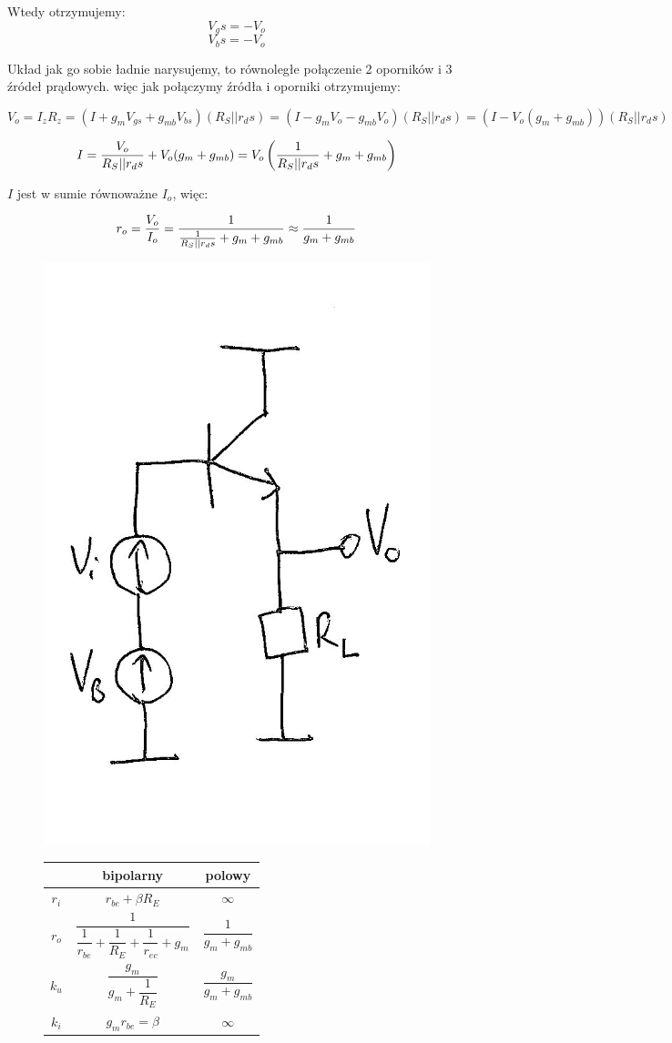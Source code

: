 \documentclass[10pt,a4paper]{article}
\begin{document}
Wtedy otrzymujemy:
\begin{equation}
V_gs = - V_o
\end{equation}
\begin{equation}
V_bs = - V_o
\end{equation}

Układ jak go sobie ładnie narysujemy, to równoległe połączenie 2 oporników i 3 źródeł prądowych. więc jak połączymy źródła i oporniki otrzymujemy:

\begin{equation}
V_o = {I_z R_z} = (I + g_mV_{gs} + g_{mb}V_{bs})(R_S || r_ds) = (I - g_mV_o - g_{mb}V_o)(R_S || r_ds) = (I - V_o(g_m + g_{mb}))(R_S || r_ds)
\end{equation}

\begin{equation}
I = {V_o \over R_S || r_ds} + V_o(g_m + g_{mb}) = V_o\left({1 \over R_S || r_ds} + g_m + g_{mb}\right)
\end{equation}

$I$ jest w sumie równoważne $I_o$, więc:

\begin{equation}
r_o = {V_o \over I_o} = {1 \over{1 \over R_S || r_ds} + g_m + g_{mb}} \approx {1 \over g_m + g_{mb}}
\end{equation}

\begin{figure}[H]
\centering
\includegraphics[height=0.3\textwidth]{WC.png}
\begin{tabular}{c|c|c}
& bipolarny & polowy\\
\hline
$r_i$ & $r_{be} + \beta R_E$ & $\infty$ \\ 

$r_o$ & $\dfrac{1}{\dfrac{1}{r_{be}}+\dfrac{1}{R_E}+\dfrac{1}{r_{ec}}+g_m}$ & $\dfrac{1}{g_m + g_{mb}}$ \\ 

$k_u$ & $\dfrac{g_m}{g_m+\dfrac{1}{R_E}}$ & $\dfrac{g_m}{g_m+g_{mb}}$ \\ 

$k_i$ & $g_m r_{be} = \beta$ & $\infty$ \\ 

\end{tabular} 
\end{figure}
\end{document}
